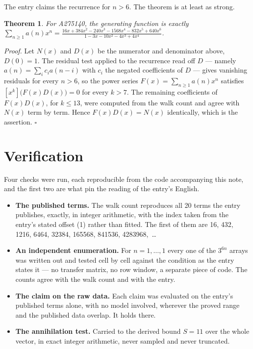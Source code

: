 \documentclass[11pt]{article}
\newtheorem{theorem}{Theorem}
\theoremstyle{definition}
\begin{document}
The entry claims the recurrence for $n > 6$. The theorem is at least as strong.

\begin{theorem} For A275140, the generating function is exactly $\sum_{n\ge 1} a(n)x^n = \frac{16x + 384x^{2} - 240x^{3} - 1568x^{4} - 832x^{5} + 640x^{6}}{1 - 3x - 10x^{2} - 4x^{3} + 4x^{4}}$.\end{theorem}

{\itshape Proof.} Let $N(x)$ and $D(x)$ be the numerator and denominator above, $D(0)=1$. The residual test applied to the recurrence read off $D$ --- namely $a(n) = \sum_i c_i a(n-i)$ with $c_i$ the negated coefficients of $D$ --- gives vanishing residuals for every $n > 6$, so the power series $F(x)=\sum_{n\ge 1}a(n)x^n$ satisfies $[x^k]\bigl(F(x)D(x)\bigr) = 0$ for every $k > 7$. The remaining coefficients of $F(x)D(x)$, for $k \le 13$, were computed from the walk count and agree with $N(x)$ term by term. Hence $F(x)D(x) = N(x)$ identically, which is the assertion. $\square$

\section{Verification}

Four checks were run, each reproducible from the code accompanying this note, and the first two are what pin the reading of the entry's English.

\begin{itemize}

\item {\bfseries The published terms.} The walk count reproduces all 20 terms the entry publishes, exactly, in integer arithmetic, with the index taken from the entry's stated offset (1) rather than fitted. The first of them are 16, 432, 1216, 6464, 32384, 165568, 841536, 4283968,~\dots

\item {\bfseries An independent enumeration.} For $n = 1,\dots,1$ every one of the $3^{6n}$ arrays was written out and tested cell by cell against the condition as the entry states it --- no transfer matrix, no row window, a separate piece of code. The counts agree with the walk count and with the entry.

\item {\bfseries The claim on the raw data.} Each claim was evaluated on the entry's published terms alone, with no model involved, wherever the proved range and the published data overlap. It holds there.

\item {\bfseries The annihilation test.} Carried to the derived bound $S = 11$ over the whole vector, in exact integer arithmetic, never sampled and never truncated.

\end{itemize}
\end{document}
